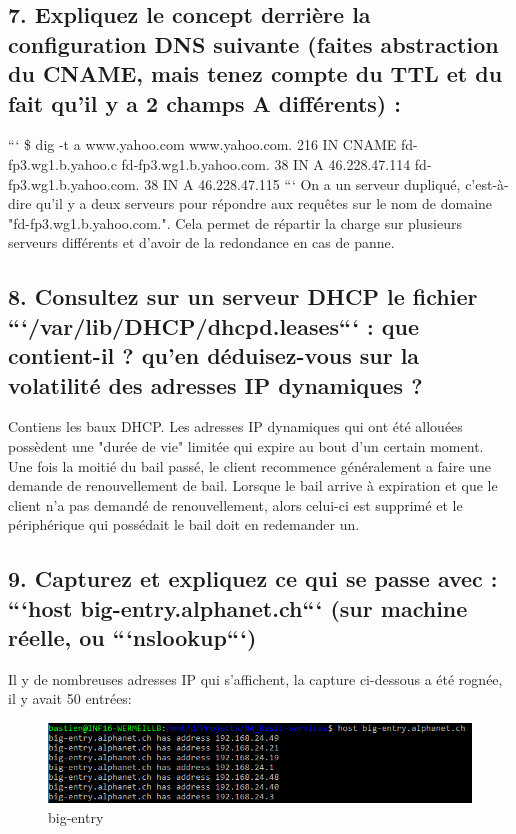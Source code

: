 \documentclass{article}
\begin{document}
\subsection*{7. Expliquez le concept derrière la configuration DNS suivante (faites abstraction du CNAME, mais tenez compte du TTL et du fait qu’il y a 2 champs A différents) :}
```
\$ dig -t a www.yahoo.com
www.yahoo.com.            216   IN    CNAME   fd-fp3.wg1.b.yahoo.c
fd-fp3.wg1.b.yahoo.com.   38    IN    A       46.228.47.114
fd-fp3.wg1.b.yahoo.com.   38    IN    A       46.228.47.115
```
On a un serveur dupliqué, c'est-à-dire qu'il y a deux serveurs pour répondre aux requêtes sur le nom de domaine "fd-fp3.wg1.b.yahoo.com.". Cela permet de répartir la charge sur plusieurs serveurs différents et d'avoir de la redondance en cas de panne.

\subsection*{8. Consultez sur un serveur DHCP le fichier ```/var/lib/DHCP/dhcpd.leases``` : que contient-il ? qu’en déduisez-vous sur la volatilité des adresses IP dynamiques ?}
Contiens les baux DHCP. Les adresses IP dynamiques qui ont été allouées possèdent une "durée de vie" limitée qui expire au bout d'un certain moment. Une fois la moitié du bail passé, le client recommence généralement a faire une demande de renouvellement de bail. Lorsque le bail arrive à expiration et que le client n'a pas demandé de renouvellement, alors celui-ci est supprimé et le périphérique qui possédait le bail doit en redemander un.

\subsection*{9. Capturez et expliquez ce qui se passe avec : ```host big-entry.alphanet.ch``` (sur machine réelle, ou ```nslookup```)}
Il y de nombreuses adresses IP qui s'affichent, la capture ci-dessous a été rognée, il y avait 50 entrées:

\begin{figure}[h]
	\centering
	\includegraphics{./captures/big-entry.png}
	\caption{big-entry}
	\label{fig:Strates}
\end{figure}
\end{document}
